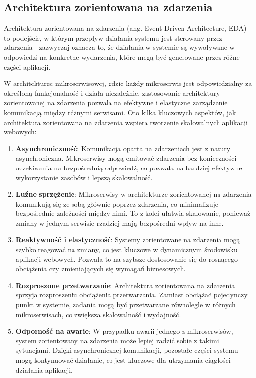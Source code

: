 \subsection{Architektura zorientowana na zdarzenia}

Architektura zorientowana na zdarzenia (ang. Event-Driven Architecture, EDA) to podejście, w którym przepływ działania systemu jest sterowany przez zdarzenia - zazwyczaj oznacza to, że działania w systemie są wywoływane w odpowiedzi na konkretne wydarzenia, które mogą być generowane przez różne części aplikacji.

W architekturze mikroserwisowej, gdzie każdy mikroserwis jest odpowiedzialny za określoną funkcjonalność i działa niezależnie, zastosowanie architektury zorientowanej na zdarzenia pozwala na efektywne i elastyczne zarządzanie komunikacją między różnymi serwisami. Oto kilka kluczowych aspektów, jak architektura zorientowana na zdarzenia wspiera tworzenie skalowalnych aplikacji webowych:

\begin{enumerate}
    \item \textbf{Asynchroniczność}: Komunikacja oparta na zdarzeniach jest z natury asynchroniczna. Mikroserwisy mogą emitować zdarzenia bez konieczności oczekiwania na bezpośrednią odpowiedź, co pozwala na bardziej efektywne wykorzystanie zasobów i lepszą skalowalność.

    \item \textbf{Luźne sprzężenie}: Mikroserwisy w architekturze zorientowanej na zdarzenia komunikują się ze sobą głównie poprzez zdarzenia, co minimalizuje bezpośrednie zależności między nimi. To z kolei ułatwia skalowanie, ponieważ zmiany w jednym serwisie rzadziej mają bezpośredni wpływ na inne.

    \item \textbf{Reaktywność i elastyczność}: Systemy zorientowane na zdarzenia mogą szybko reagować na zmiany, co jest kluczowe w dynamicznym środowisku aplikacji webowych. Pozwala to na szybsze dostosowanie się do rosnącego obciążenia czy zmieniających się wymagań biznesowych.

    \item \textbf{Rozproszone przetwarzanie}: Architektura zorientowana na zdarzenia sprzyja rozproszeniu obciążenia przetwarzania. Zamiast obciążać pojedynczy punkt w systemie, zadania mogą być przetwarzane równolegle w różnych mikroserwisach, co zwiększa skalowalność i wydajność.

    \item \textbf{Odporność na awarie}: W przypadku awarii jednego z mikroserwisów, system zorientowany na zdarzenia może lepiej radzić sobie z takimi sytuacjami. Dzięki asynchronicznej komunikacji, pozostałe części systemu mogą kontynuować działanie, co jest kluczowe dla utrzymania ciągłości działania aplikacji.
\end{enumerate}

